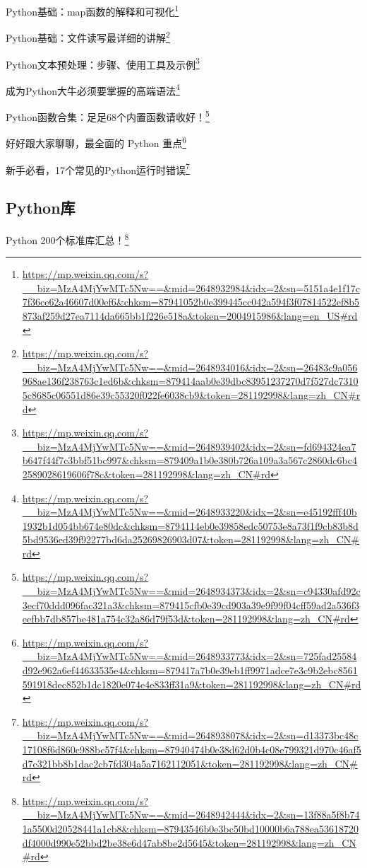 \documentclass[]{ctexbook}
\renewcommand{\href}[2]{#2\footnote{\url{#1}}}
\begin{document}
\href{https://mp.weixin.qq.com/s?__biz=MzA4MjYwMTc5Nw==\&mid=2648932984\&idx=2\&sn=5151a4e1f17c7f36ce62a46607d00ef6\&chksm=87941052b0e399445cc042a594f3f07814522ef8b5873af259d27ea7114da665bb1f226e518a\&token=2004915986\&lang=en_US\#rd}{Python基础：map函数的解释和可视化}

\href{https://mp.weixin.qq.com/s?__biz=MzA4MjYwMTc5Nw==\&mid=2648934016\&idx=2\&sn=26483c9a056968ae136f238763c1ed6b\&chksm=879414aab0e39dbc83951237270d7f527dc73105c8685c06551d86e39c55320f022fe6038cb9\&token=281192998\&lang=zh_CN\#rd}{Python基础：文件读写最详细的讲解}

\href{https://mp.weixin.qq.com/s?__biz=MzA4MjYwMTc5Nw==\&mid=2648939402\&idx=2\&sn=fd694324ea7b647f44f7c3bbf51bc997\&chksm=879409a1b0e380b726a109a3a567c2860dc6bc42589028619606f78c\&token=281192998\&lang=zh_CN\#rd}{Python文本预处理：步骤、使用工具及示例}

\href{https://mp.weixin.qq.com/s?__biz=MzA4MjYwMTc5Nw==\&mid=2648933220\&idx=2\&sn=e45192fff40b1932b1d054bb674e80dc\&chksm=8794114eb0e39858edc50753e8a73f1f9cb83b8d5bd9536ed39f92277bd6da25269826903d07\&token=281192998\&lang=zh_CN\#rd}{成为Python大牛必须要掌握的高端语法}

\href{https://mp.weixin.qq.com/s?__biz=MzA4MjYwMTc5Nw==\&mid=2648934373\&idx=2\&sn=c94330afd92c3ecf70ddd096fac321a3\&chksm=879415cfb0e39cd903a39e9f99f04cff59ad2a536f3eefbb7db857be481a754c32a86d79f53d\&token=281192998\&lang=zh_CN\#rd}{Python函数合集：足足68个内置函数请收好！}

\href{https://mp.weixin.qq.com/s?__biz=MzA4MjYwMTc5Nw==\&mid=2648933773\&idx=2\&sn=725fad25584d92e962a6ef44633535e4\&chksm=879417a7b0e39eb1ff9971adce7e3c9b2ebc8561591918dec852b1dc1820e074e4e833ff31a9\&token=281192998\&lang=zh_CN\#rd}{好好跟大家聊聊，最全面的 Python 重点}

\href{https://mp.weixin.qq.com/s?__biz=MzA4MjYwMTc5Nw==\&mid=2648938078\&idx=2\&sn=d13373bc48c17108f6d860c988bc57f4\&chksm=87940474b0e38d62d0b4c08e799321d970c46af5d7c321bb8b1dac2cb7fd304a5a7162112051\&token=281192998\&lang=zh_CN\#rd}{新手必看，17个常见的Python运行时错误}

\hypertarget{pythonux5e93}{%
\subsection{Python库}\label{pythonux5e93}}

\href{https://mp.weixin.qq.com/s?__biz=MzA4MjYwMTc5Nw==\&mid=2648942444\&idx=2\&sn=13f88a5f8b741a5500d20528441a1cb8\&chksm=87943546b0e3bc50bd10000b6a788ea53618720df4000d990e52bbd2be38e6d47ab8be2d5645\&token=281192998\&lang=zh_CN\#rd}{Python 200个标准库汇总！}
\end{document}
